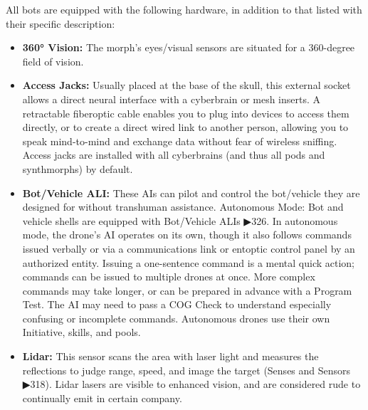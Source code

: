 All bots are equipped with the following hardware, in addition to that listed with their specific description:

\begin{itemize}
    \item \textbf{360° Vision:} The morph’s eyes/visual sensors are situated for a 360-degree field of vision. \citep[pg. 318]{ep2e_1.1_2019}

    \item \textbf{Access Jacks:} Usually placed at the base of the skull, this external socket allows a direct neural interface with a cyberbrain or mesh inserts. A retractable fiberoptic cable enables you to plug into devices to access them directly, or to create a direct wired link to another person, allowing you to speak mind-to-mind and exchange data without fear of wireless sniffing. Access jacks are installed with all cyberbrains (and thus all pods and synthmorphs) by default. \citep[pg. 318]{ep2e_1.1_2019}

    \item \textbf{Bot/Vehicle ALI:} These AIs can pilot and control the bot/vehicle they are designed for without transhuman assistance. Autonomous Mode: Bot and vehicle shells are equipped with Bot/Vehicle ALIs ▶326. In autonomous mode, the drone’s AI operates on its own, though it also follows commands issued verbally or via a communications link or entoptic control panel by an authorized entity. Issuing a one-sentence command is a mental quick action; commands can be issued to multiple drones at once. More complex commands may take longer, or can be prepared in advance with a Program Test. The AI may need to pass a COG Check to understand especially confusing or incomplete commands. Autonomous drones use their own Initiative, skills, and pools. \citep[pg. 326, 346]{ep2e_1.1_2019}

    \item \textbf{Lidar:} This sensor scans the area with laser light and measures the reflections to judge range, speed, and image the target (Senses and Sensors ▶318). Lidar lasers are visible to enhanced vision, and are considered rude to continually emit in certain company. \citep[pg. 318]{ep2e_1.1_2019}


\end{itemize}
